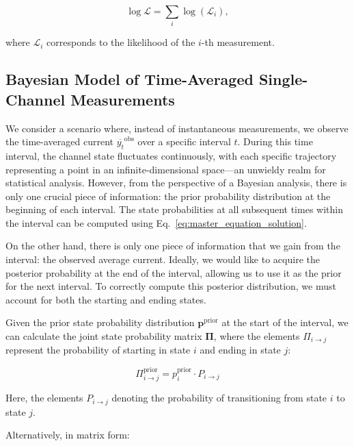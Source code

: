 \documentclass[pdflatex,sn-mathphys-num]{sn-jnl}%
\theoremstyle{thmstyleone}%
\theoremstyle{thmstyletwo}%
\theoremstyle{thmstylethree}%
\begin{document}
\begin{equation}
	\log \mathcal{L} = \sum_i \log (\mathcal{L}_i),
	\label{eq:total_loglikelihood}
\end{equation}

where \( \mathcal{L}_i \) corresponds to the likelihood of the \( i \)-th measurement.


\subsection{Bayesian Model of Time-Averaged Single-Channel Measurements}

We consider a scenario where, instead of instantaneous measurements, we observe the time-averaged current \( \overline{y_t}^{\text{obs}} \) over a specific interval \( t \). During this time interval, the channel state fluctuates continuously, with each specific trajectory representing a point in an infinite-dimensional space—an unwieldy realm for statistical analysis. However, from the perspective of a Bayesian analysis, there is only one crucial piece of information: the prior probability distribution at the beginning of each interval. The state probabilities at all subsequent times within the interval can be computed using Eq.~\ref{eq:master_equation_solution}. 

On the other hand, there is only one piece of information that we gain from the interval: the observed average current. Ideally, we would like to acquire the posterior probability at the end of the interval, allowing us to use it as the prior for the next interval. To correctly compute this posterior distribution, we must account for both the starting and ending states.

Given the prior state probability distribution \( \boldsymbol{p}^{\text{prior}} \) at the start of the interval, we can calculate the joint state probability matrix \( \boldsymbol{\Pi} \), where the elements \( \Pi_{i\rightarrow j} \) represent the probability of starting in state \( i \) and ending in state \( j \):

\begin{equation}
	\Pi_{i\rightarrow j}^{\text{prior}} = p^{\text{prior}}_i \cdot P_{i \rightarrow j}
	\label{eq:joint_state_probability}
\end{equation}

Here, the elements \( P_{i \rightarrow j} \) denoting the probability of transitioning from state \( i \) to state \( j \).

Alternatively, in matrix form:
\end{document}
